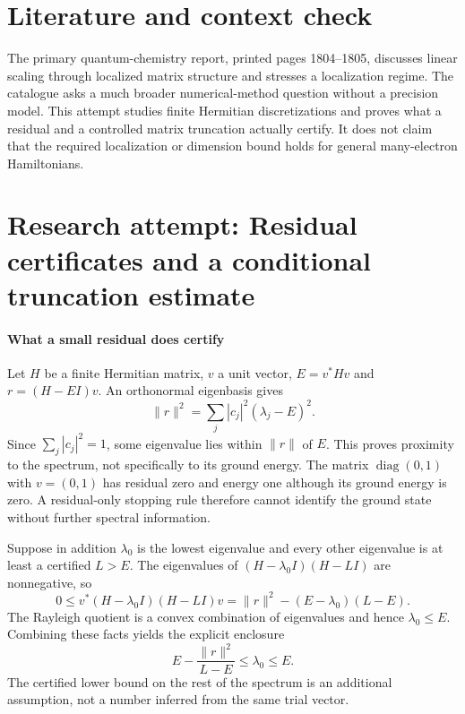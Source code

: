 \documentclass[11pt]{article}
\begin{document}
\section{Literature and context check}
The primary quantum-chemistry report, printed pages 1804--1805, discusses linear scaling through localized matrix structure and stresses a localization regime. The catalogue asks a much broader numerical-method question without a precision model. This attempt studies finite Hermitian discretizations and proves what a residual and a controlled matrix truncation actually certify. It does not claim that the required localization or dimension bound holds for general many-electron Hamiltonians.
\section{Research attempt: Residual certificates and a conditional truncation estimate}

\paragraph{What a small residual does certify}
Let $H$ be a finite Hermitian matrix, $v$ a unit vector, $E=v^*Hv$ and $r=(H-EI)v$. An orthonormal eigenbasis gives
\[
 \lVert r\rVert^2=\sum_j|c_j|^2(\lambda_j-E)^2.
\]
Since $\sum_j|c_j|^2=1$, some eigenvalue lies within $\lVert r\rVert$ of $E$. This proves proximity to the spectrum, not specifically to its ground energy. The matrix $\operatorname{diag}(0,1)$ with $v=(0,1)$ has residual zero and energy one although its ground energy is zero. A residual-only stopping rule therefore cannot identify the ground state without further spectral information.

Suppose in addition $\lambda_0$ is the lowest eigenvalue and every other eigenvalue is at least a certified $L>E$. The eigenvalues of $(H-\lambda_0I)(H-LI)$ are nonnegative, so
\[
 0\leq v^*(H-\lambda_0I)(H-LI)v
 =\lVert r\rVert^2-(E-\lambda_0)(L-E).
\]
The Rayleigh quotient is a convex combination of eigenvalues and hence $\lambda_0\leq E$. Combining these facts yields the explicit enclosure
\[
 E-\frac{\lVert r\rVert^2}{L-E}\leq\lambda_0\leq E.
\]
The certified lower bound on the rest of the spectrum is an additional assumption, not a number inferred from the same trial vector.
\end{document}
